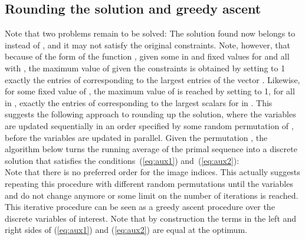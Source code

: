 \documentclass[10pt,twocolumn,letterpaper]{article}
\numberwithin{theorem}{section}
\begin{document}
\subsection{Rounding the solution and greedy ascent}
Note that two problems remain to be solved: The solution  found
now belongs to  instead of , and it may not
satisfy the original constraints. Note, however, that because of the
form of the function , given some  in  and fixed
values for  and all  with , the maximum value of 
given the constraints is obtained by setting to 1 exactly the 
entries of  corresponding to the  largest entries of the
vector . Likewise,
for some fixed value of , the maximum value of  is reached by
setting to 1, for all  in , exactly the  entries of
 corresponding to the  largest scalars  for
 in .  This suggests the following approach to
rounding up the solution, where the variables  are updated
sequentially in an order specified by some random permutation  of , before the variables  are updated in parallel.
Given the permutation , the algorithm
below turns the running average  of the primal sequence into a
discrete solution  that satisfies the
conditions~(\ref{eq:aux1}) and~(\ref{eq:aux2}):
{}\\
	
Note that there
is no preferred order for the image indices. This actually suggests
repeating this procedure with different random permutations until the
variables  and  do not change anymore or some limit on the
number of iterations is reached. This iterative procedure can be seen
as a greedy ascent procedure over the discrete variables of
interest. Note that by construction the terms in the left and right
sides of (\ref{eq:aux1}) and (\ref{eq:aux2}) are equal at the optimum.
\end{document}
